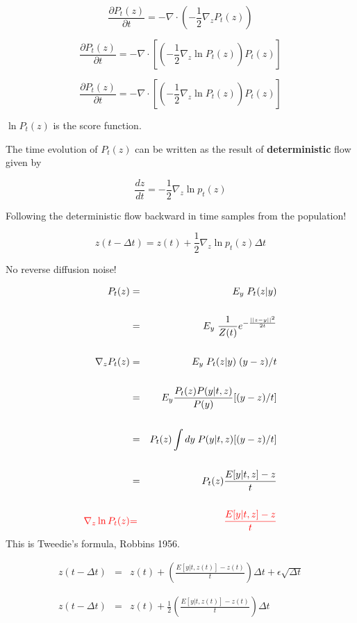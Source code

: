 {\vfill
$$\frac{\partial P_t(z)}{\partial t} = - \nabla \cdot\left(-\frac{1}{2}\nabla_z P_t(z)\right)$$

\vfill
$$\frac{\partial P_t(z)}{\partial t} = - \nabla \cdot\left[\left(-\frac{1}{2}\nabla_z \ln P_t(z)\right)P_t(z)\right]$$


$$\frac{\partial P_t(z)}{\partial t} = - \nabla \cdot\left[\left(-\frac{1}{2}\nabla_z \ln P_t(z)\right)P_t(z)\right]$$

\vfill
$\ln P_t(z)$ is the score function.

\vfill
The time evolution of $P_t(z)$ can be written as the result of {\bf deterministic} flow given by

$$\frac{dz}{dt} = - \frac{1}{2}\nabla_z \ln p_t(z)$$


Following the deterministic flow backward in time samples from the population!

$$z(t-\Delta t) = z(t) + \frac{1}{2} \nabla_z \ln p_t(z) \Delta t$$

\vfill
No reverse diffusion noise!

{\Large
\begin{eqnarray*}
  P_t(z) & = & E_y \;P_t(z|y) \\
  \\
  & = & \;E_y\;\frac{1}{Z(t)} e^{-\frac{||z-y||^2}{2t}} \\
  \\
  \nabla_z P_t(z) & = & E_y \;P_t(z|y)\; (y-z)/t \\
  \\
  & = & E_y\frac{P_t(z)P(y|t,z)}{P(y)}[(y-z)/t] \\
  \\
    & = & P_t(z)\int dy\; P(y|t,z)[(y-z)/t] \\
  \\
  & = & P_t(z)\frac{E[y|t,z]-z}{t} \\
  \\
   {\color{red} \nabla_z \ln P_t(z)}&  {\color{red}  =} & {\color{red}\frac{E[y|t,z]-z}{t}}
  \end{eqnarray*}
}
This is Tweedie's formula, Robbins 1956.


\begin{eqnarray*}
z(t - \Delta t) & = & z(t) + \left(\frac{E[y|t,z(t)] - z(t)}{t}\right)\Delta t + \epsilon\sqrt{\Delta t} \\
\\
\\
z(t -\Delta t) & = & z(t) + \frac{1}{2}\left(\frac{E[y|t,z(t)] - z(t)}{t}\right)\Delta t
\end{eqnarray*}

}

